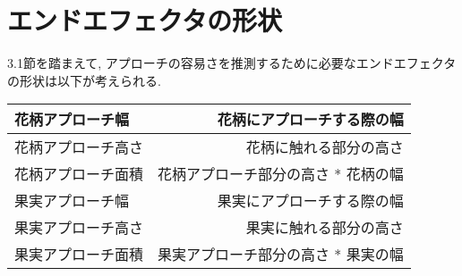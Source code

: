 \section{エンドエフェクタの形状}
3.1節を踏まえて, アプローチの容易さを推測するために必要なエンドエフェクタの形状は以下が考えられる.

\begin{center}
  \begin{tabular}{|lr|} \hline
    花柄アプローチ幅 & 花柄にアプローチする際の幅\\ \hline
    花柄アプローチ高さ & 花柄に触れる部分の高さ\\ \hline
    花柄アプローチ面積 & 花柄アプローチ部分の高さ * 花柄の幅\\ \hline 
    果実アプローチ幅 & 果実にアプローチする際の幅\\ \hline
    果実アプローチ高さ & 果実に触れる部分の高さ\\ \hline
    果実アプローチ面積 & 果実アプローチ部分の高さ * 果実の幅\\ \hline 
  \end{tabular}
  \end{center}